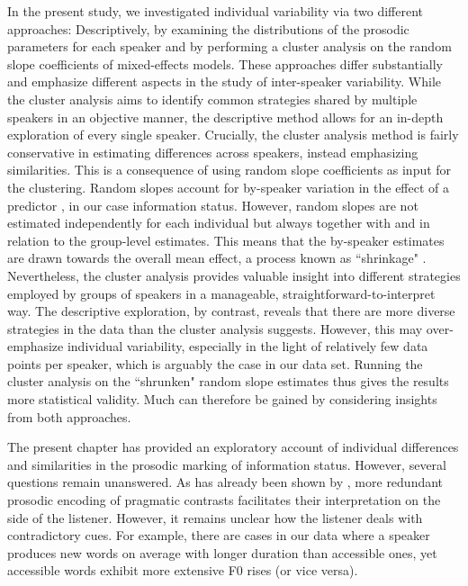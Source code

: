 In the present study, we investigated individual variability via two different approaches: Descriptively, by examining the distributions of the prosodic parameters for each speaker and by performing a cluster analysis on the random slope coefficients of mixed-effects models. These approaches differ substantially and emphasize different aspects in the study of inter-speaker variability. While the cluster analysis aims to identify common strategies shared by multiple speakers in an objective manner, the descriptive method allows for an in-depth exploration of every single speaker. Crucially, the cluster analysis method is fairly conservative in estimating differences across speakers, instead emphasizing similarities. This is a consequence of using random slope coefficients as input for the clustering. Random slopes account for by-speaker variation in the effect of a predictor \citep[e.g.,][]{winterStatisticsLinguistsIntroduction2020}, in our case information status. However, random slopes are not estimated independently for each individual but always together with and in relation to the group-level estimates. This means that the by-speaker estimates are drawn towards the overall mean effect, a process known as ``shrinkage" \citep[271-272]{winterStatisticsLinguistsIntroduction2020}. Nevertheless, the cluster analysis provides valuable insight into different strategies employed by groups of speakers in a manageable, straightforward-to-interpret way. The descriptive exploration, by contrast, reveals that there are more diverse strategies in the data than the cluster analysis suggests. However, this may over-emphasize individual variability, especially in the light of relatively few data points per speaker, which is arguably the case in our data set. Running the cluster analysis on the ``shrunken" random slope estimates thus gives the results more statistical validity. Much can therefore be gained by considering insights from both approaches.

The present chapter has provided an exploratory account of individual differences and similarities in the prosodic marking of information status. However, several questions remain unanswered. As has already been shown by \citet{cangemiListenerSpecificPerceptionSpeakerSpecific2015}, more redundant prosodic encoding of pragmatic contrasts facilitates their interpretation on the side of the listener. However, it remains unclear how the listener deals with contradictory cues. For example, there are cases in our data where a speaker produces new words on average with longer duration than accessible ones, yet accessible words exhibit more extensive F0 rises (or vice versa).

